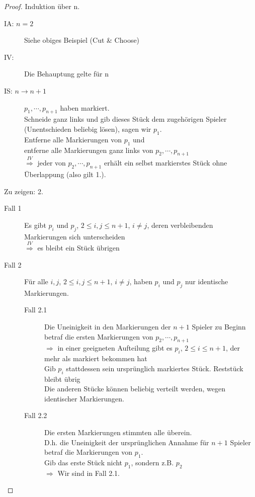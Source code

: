 \documentclass[a4paper,10pt]{scrartcl}
\begin{document}
\begin{proof}
 Induktion über n.
 \begin{description}
  \item[IA: $n=2$] Siehe obiges Beispiel (Cut \& Choose)
  \item[IV:] Die Behauptung gelte für n
  \item[IS: $n\rightarrow n+1$] $p_1,\cdots,p_{n+1}$ haben markiert.\\Schneide ganz links und gib dieses Stück dem zugehörigen Spieler
       (Unentschieden beliebig lösen), sagen wir $p_1$.\\Entferne alle Markierungen von $p_1$ und\\entferne alle Markierungen ganz links von
       $p_2,\cdots,p_{n+1}$\\$\stackrel{IV}{\Rightarrow}$ jeder von $p_2,\cdots,p_{n+1}$ erhält ein selbst markierstes Stück ohne Überlappung
       (also gilt 1.).
 \end{description}
 Zu zeigen: 2.
 \begin{description}
  \item[Fall 1] Es gibt $p_i$ und $p_j$, $2\leq i,j\leq n+1$, $i\neq j$, deren verbleibenden Markierungen sich unterscheiden\\
                $\stackrel{IV}{\Rightarrow}$ es bleibt ein Stück übrigen
  \item[Fall 2] Für alle $i,j$, $2\leq i,j\leq n+1$, $i\neq j$, haben $p_i$ und $p_j$ nur identische Markierungen.
   \begin{description}
    \item[Fall 2.1] Die Uneinigkeit in den Markierungen der $n+1$ Spieler zu Beginn betraf die ersten Markierungen von $p_2,\cdots,p_{n+1}$\\
                    $\Rightarrow$ in einer geeigneten Aufteilung gibt es $p_i$, $2\leq i\leq n+1$, der mehr als markiert bekommen hat\\
                    Gib $p_i$ stattdessen sein ursprünglich markiertes Stück. Reststück bleibt übrig\\
                    Die anderen Stücke können beliebig verteilt werden, wegen identischer Markierungen.
    \item[Fall 2.2] Die ersten Markierungen stimmten alle überein.\\
                    D.h. die Uneinigkeit der ursprünglichen Annahme für $n+1$ Spieler betraf die Markierungen von $p_1$.\\
                    Gib das erste Stück nicht $p_1$, sondern z.B. $p_2$\\
                    $\Rightarrow$ Wir sind in Fall 2.1.
   \end{description}
 \end{description}
\end{proof}
\end{document}
